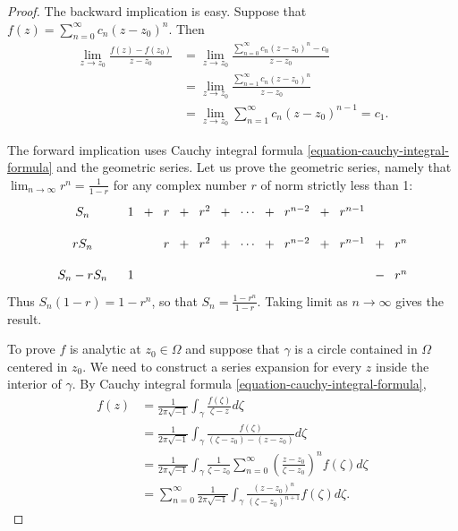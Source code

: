\begin{proof}
The backward implication is easy.
Suppose that $f(z)=\sum_{n=0}^\infty
c_n(z-z_0)^n$.
Then
$$
\begin{aligned}
\lim_{z \to z_0}\frac{f(z)-f(z_0)}{z-z_0} &=
\lim_{z\to z_0}\frac{\sum_{n=0}^\infty
c_n(z-z_0)^n-c_0}{z-z_0}\\
&=\lim_{z\to z_0}\frac{\sum_{n=1}^\infty
c_n(z-z_0)^n}{z-z_0}\\
&=\lim_{z\to z_0}\sum_{n=1}^\infty
c_n(z-z_0)^{n-1}=c_1.
\end{aligned}
$$

\noindent
The forward implication uses Cauchy integral
formula
\ref{equation-cauchy-integral-formula} and
the geometric series.
Let us prove the geometric series, namely
that
$\lim_{n\to\infty} r^n=\frac{1}{1-r}$ for any
complex number $r$ of
norm strictly less than 1:
$$
\xymatrix@C=.2em@R=1em{
S_n & & 1
\ar@{}[r]&+&r\ar@{}[r]&+&r^2\ar@{}[r]&+&
\cdots\ar@{}[r]&+
&r^{n-2}\ar@{}[r]&+&r^{n-1}\\
rS_n & & & &
r\ar@{}[r]&+&r^2\ar@{}[r]&+&\cdots\ar@{}[r]&+
&r^{n-2}\ar@{}[r]&+&r^{n-1}\ar@{}[r]&+&r^n\\
S_n-rS_n& & 1 & & & & & & & & & & & - & r^n
}
$$
Thus $S_n(1-r)=1-r^n$, so that
$S_n=\frac{1-r^n}{1-r}$.
Taking limit as $n\to \infty$ gives the
result.

\medskip\noindent
To prove $f$ is analytic at $z_0\in \Omega$
and suppose that $\gamma$ is a circle
contained in $\Omega$
centered in $z_0$.
We need to construct a series expansion for
every $z$ inside the interior of $\gamma$.
By Cauchy integral formula
\ref{equation-cauchy-integral-formula},
$$
\begin{aligned}
f(z)&=\frac{1}{2\pi\sqrt{-1}}\int_\gamma
\frac{f(\zeta)}{\zeta-z}d\zeta\\
&=\frac{1}{2\pi\sqrt{-1}}
\int_\gamma\frac{f(\zeta)}{(\zeta-z_0)-(z-
z_0)}d\zeta\\
&=\frac{1}{2\pi\sqrt{-1}}
\int_\gamma \frac{1}{\zeta-z_0}
\sum_{n=0}^\infty\left(\frac{z-z_0}{\zeta-
z_0}\right)^n
f(\zeta)d\zeta\\
&=\sum_{n=0}^\infty \frac{1}{2\pi\sqrt{-1}}
\int_\gamma\frac{(z-z_0)^n}{(\zeta-z_0)^{n+1}
}f(\zeta)d\zeta.
\end{aligned}
$$


\end{proof}
